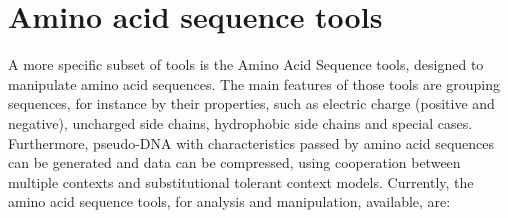 \chapter{Amino acid sequence tools}
\label{seq}
A more specific subset of tools is the Amino Acid Sequence tools, designed to manipulate amino acid sequences. The main features of those tools are grouping sequences, for instance by their properties, such as electric charge (positive and negative), uncharged side chains, hydrophobic side chains and special cases. Furthermore, pseudo-DNA with characteristics passed by amino acid sequences can be generated and data can be compressed, using cooperation between multiple contexts and substitutional tolerant context models. Currently, the amino acid sequence tools, for analysis and manipulation, available, are:
